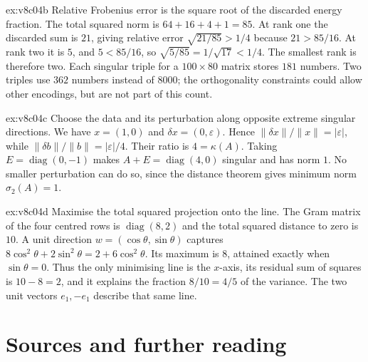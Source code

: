 \begin{solution}{ex:v8c04b}
\idea Relative Frobenius error is the square root of the discarded energy fraction.
\writeup The total squared norm is $64+16+4+1=85$. At rank one the discarded sum is $21$, giving relative error $\sqrt{21/85}>1/4$ because $21>85/16$. At rank two it is $5$, and $5<85/16$, so $\sqrt{5/85}=1/\sqrt{17}<1/4$. The smallest rank is therefore two. Each singular triple for a $100\times80$ matrix stores $181$ numbers. Two triples use $362$ numbers instead of $8000$; the orthogonality constraints could allow other encodings, but are not part of this count.
\end{solution}

\begin{solution}{ex:v8c04c}
\idea Choose the data and its perturbation along opposite extreme singular directions.
\writeup We have $x=(1,0)$ and $\delta x=(0,\varepsilon)$. Hence $\|\delta x\|/\|x\|=|\varepsilon|$, while $\|\delta b\|/\|b\|=|\varepsilon|/4$. Their ratio is $4=\kappa(A)$. Taking $E=\operatorname{diag}(0,-1)$ makes $A+E=\operatorname{diag}(4,0)$ singular and has norm $1$. No smaller perturbation can do so, since the distance theorem gives minimum norm $\sigma_2(A)=1$.
\end{solution}

\begin{solution}{ex:v8c04d}
\idea Maximise the total squared projection onto the line.
\writeup The Gram matrix of the four centred rows is $\operatorname{diag}(8,2)$ and the total squared distance to zero is $10$. A unit direction $w=(\cos\theta,\sin\theta)$ captures $8\cos^2\theta+2\sin^2\theta=2+6\cos^2\theta$. Its maximum is $8$, attained exactly when $\sin\theta=0$. Thus the only minimising line is the $x$-axis, its residual sum of squares is $10-8=2$, and it explains the fraction $8/10=4/5$ of the variance. The two unit vectors $e_1,-e_1$ describe that same line.
\end{solution}

\section*{Sources and further reading}

